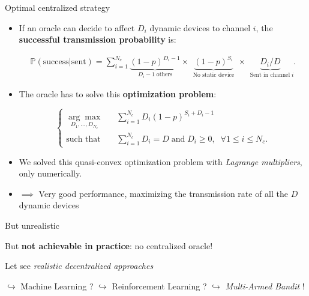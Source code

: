 \documentclass[12pt,english,ignorenonframetext,]{beamer}
\providecommand{\tightlist}{%
  \setlength{\itemsep}{0pt}\setlength{\parskip}{0pt}}
\begin{document}
\begin{frame}[allowframebreaks]{Optimal centralized strategy}

\begin{itemize}
\tightlist
\item
  If an oracle can decide to affect \(D_i\) dynamic devices to channel
  \(i\), the \textbf{successful transmission probability} is:
  \vspace*{-10pt}

  \begin{small} \begin{align*}
  \mathbb{P}(\text{success}|\text{sent}) = \sum_{i=1}^{N_c} \underbrace{(1 - p)^{D_i - 1}}_{\;\;D_i - 1 \;\text{others}\;\;} \times \underbrace{(1 - p)^{S_i}}_{\;\;\text{No static device}\;\;} \times \underbrace{ D_i / D }_{\;\;\text{Sent in channel}\; i}.
  \end{align*} \end{small}
\item
  The oracle has to solve this \textbf{optimization problem}:
  \vspace*{-5pt}

  \begin{small} \begin{equation*} \begin{cases}
  \underset{D_1,\dots,D_{N_c}}{\arg\max}\;\;\; & \sum_{i=1}^{N_c} D_i (1 - p)^{S_i + D_i -1}\\
  \text{such that}\;\;\; & \sum_{i=1}^{N_c} D_i = D \; \text{and} \; D_i \geq 0, \; \; \forall 1 \leq i \leq N_c .
  \end{cases} \end{equation*} \end{small}
\item
  We solved this quasi-convex optimization problem with \emph{Lagrange
  multipliers}, only numerically.
\item
  \(\implies\) Very good performance, maximizing the transmission rate
  of all the \(D\) dynamic devices
\end{itemize}

\begin{block}{But unrealistic}

But \textbf{not achievable in practice}: no centralized oracle!

\end{block}

\begin{block}{Let see \emph{realistic decentralized approaches}}

\(\hookrightarrow\) Machine Learning ? \newline
\hspace*{15pt}\(\hookrightarrow\) Reinforcement Learning ? \newline
\hspace*{30pt} \(\hookrightarrow\) \emph{Multi-Armed Bandit} !

\end{block}

\end{frame}
\end{document}
